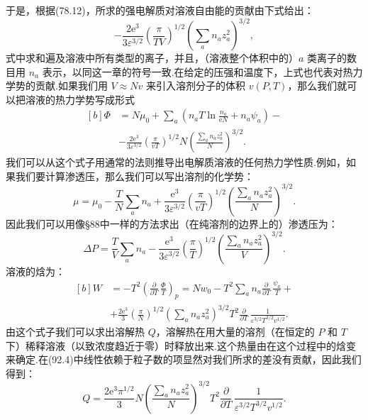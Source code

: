 于是，根据(78.12)，所求的强电解质对溶液自由能的贡献由下式给出：
\begin{equation*}
  -\frac{2\mathrm{e}^3}{3\varepsilon^{3/2}}
  \left(\frac{\pi}{TV}\right)^{1/2}
  \left(\sum_an_az_a^2\right)^{3/2},
\end{equation*}
式中求和遍及溶液中所有类型的离子，并且，（溶液整个体积中的）$a$ 类离子的数目用 $n_a$ 表示，以同这一章的符号一致.在给定的压强和温度下，上式也代表对热力学势的贡献.如果我们用 $V\approx Nv$ 来引入溶剂分子的体积 $v(P,T)$，那么我们就可以把溶液的热力学势写成形式
\begin{equation}
\begin{aligned}[b]
  \varPhi&=N\mu_0+\sum_a\left(n_aT\ln\frac{n_a}{\mathrm{e}N}+n_a\psi_a\right)-\\
  &-\frac{2\mathrm{e}^3}{3\varepsilon^{3/2}}\left(\frac{\pi}{vT}\right)^{1/2}
  N\left(\frac{\sum_an_az_a^2}{N}\right)^{3/2}.
\end{aligned}
\end{equation}
我们可以从这个式子用通常的法则推导出电解质溶液的任何热力学性质.例如，如果我们要计算渗透压，那么我们可以写出溶剂的化学势：
\begin{equation}
  \mu=\mu_0-\frac{T}{N}\sum_an_a
  +\frac{\mathrm{e}^3}{3\varepsilon^{3/2}}\left(\frac{\pi}{vT}\right)^{1/2}
  \left(\frac{\sum_an_az_a^2}{N}\right)^{3/2}.
\end{equation}
因此我们可以用像§88中一样的方法求出（在纯溶剂的边界上的）渗透压为：
\begin{equation}
  \Delta P=\frac{T}{V}\sum_an_a
  -\frac{\mathrm{e}^3}{3\varepsilon^{3/2}}\left(\frac{\pi}{T}\right)^{1/2}
  \left(\frac{\sum_an_az_a^2}{V}\right)^{3/2}.
\end{equation}
溶液的焓为：
\begin{equation}
\begin{aligned}[b]
  W&=-T^2\left(\frac{\partial}{\partial T}\,\frac{\varPhi}{T}\right)_p
  =Nw_0-T^2\sum_an_a\frac{\partial}{\partial T}\,\frac{\psi_a}{T}+\\
  &+\frac{2\mathrm{e}^3}{3}\left(\frac{\pi}{N}\right)^{1/2}
  \left(\sum_an_az_a^2\right)^{3/2}T^2
  \frac{\partial}{\partial T}\,\frac{1}{\varepsilon^{3/2}T^{3/2}v^{1/2}}.
\end{aligned}
\end{equation}
由这个式子我们可以求出溶解热 $Q$，溶解热在用大量的溶剂（在恒定的 $P$ 和 $T$ 下）稀释溶液（以致浓度趋近于零）时释放出来.这个热量由在这个过程中的焓变来确定.在(92.4)中线性依赖于粒子数的项显然对我们所求的差没有贡献，因此我们得到：
\begin{equation}
  Q=\frac{2\mathrm{e}^3\pi^{1/2}}{3}N
  \left(\frac{\sum_an_az_a^2}{N}\right)^{3/2}T^2
  \frac{\partial}{\partial T}\,\frac{1}{\varepsilon^{3/2}T^{3/2}v^{1/2}}.
\end{equation}
